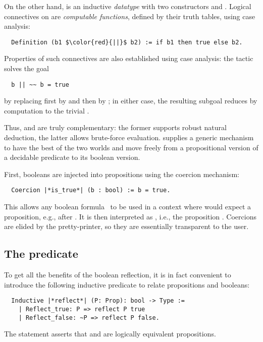 On the other hand,  is an inductive \emph{datatype}
with two constructors  and .
Logical connectives on  are \emph{computable functions}, defined by
their truth tables, using case analysis:
\begin{lstlisting}
  Definition (b1 $\color{red}{||}$ b2) := if b1 then true else b2.
\end{lstlisting}
Properties of such connectives are also established using case
analysis: the tactic  solves the goal
\begin{lstlisting}
  b || ~~ b = true
\end{lstlisting}
by replacing  first by  and then by ; in either case,
the resulting subgoal reduces by computation to the trivial
.

Thus,  and  are truly complementary: the former
supports robust natural deduction, the latter allows brute-force
evaluation.
\ssr{} supplies
a generic mechanism to have the best of the two worlds and move freely
from a propositional version of a
decidable predicate to its boolean version.

First, booleans are injected into propositions
using the coercion mechanism:
\begin{lstlisting}
  Coercion |*is_true*| (b : bool) := b = true.
\end{lstlisting}
This allows any boolean formula~ to be used in a context
where \Coq{} would expect a proposition, e.g., after .
It is then interpreted as , i.e.,
the  proposition . Coercions are elided by the pretty-printer,
so they are essentially transparent to the user.


\subsection{The  predicate}\label{ssec:reflpred}

To get all the benefits of the boolean reflection, it is in fact
convenient to introduce the following inductive predicate
 to relate propositions and booleans:

\begin{lstlisting}
  Inductive |*reflect*| (P: Prop): bool -> Type :=
    | Reflect_true: P => reflect P true
    | Reflect_false: ~P => reflect P false.
\end{lstlisting}

The statement  asserts that 
and  are logically equivalent propositions.


